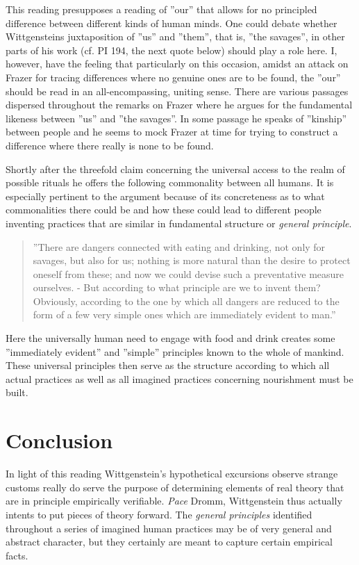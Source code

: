 \documentclass{article}
\begin{document}
This reading presupposes a reading of ''our'' that allows for no principled difference between different kinds of human minds. One could debate whether Wittgensteins juxtaposition of ''us'' and ''them'', that is, ''the savages'', in other parts of his work (cf. PI 194, the next quote below) should play a role here. I, however, have the feeling that particularly on this occasion, amidst an attack on Frazer for tracing differences where no genuine ones are to be found, the ''our'' should be read in an all-encompassing, uniting sense. There are various passages dispersed throughout the remarks on Frazer where he argues for the fundamental likeness between ''us'' and ''the savages''. In some passage he speaks of ''kinship'' between people and he seems to mock Frazer at time for trying to construct a difference where there really is none to be found. 

Shortly after the threefold claim concerning the universal access to the realm of possible rituals he offers the following commonality between all humans. It is especially pertinent to the argument because of its concreteness as to what commonalities there could be and how these could lead to different people inventing practices that are similar in fundamental structure or \textit{general principle}.
\begin{quote}
''There are dangers connected with eating and drinking, not only for savages, but also for us; nothing is more natural than the desire to protect oneself from these; and now we could devise such a preventative measure ourselves. - But according to what principle are we to invent them? Obviously, according to the one by which all dangers are reduced to the form of a few very simple ones which are immediately evident to man.''
\end{quote}
Here the universally human need to engage with food and drink creates some ''immediately evident'' and ''simple'' principles known to the whole of mankind. These universal principles then serve as the structure according to which all actual practices as well as all imagined practices concerning nourishment must be built.

\section{Conclusion}
In light of this reading Wittgenstein's hypothetical excursions observe strange customs really do serve the purpose of determining elements of real theory that are in principle empirically verifiable. \textit{Pace} Dromm, Wittgenstein thus actually intents to put pieces of theory forward. The \textit{general principles} identified throughout a series of imagined human practices may be of very general and abstract character, but they certainly are meant to capture certain empirical facts. 
\end{document}
